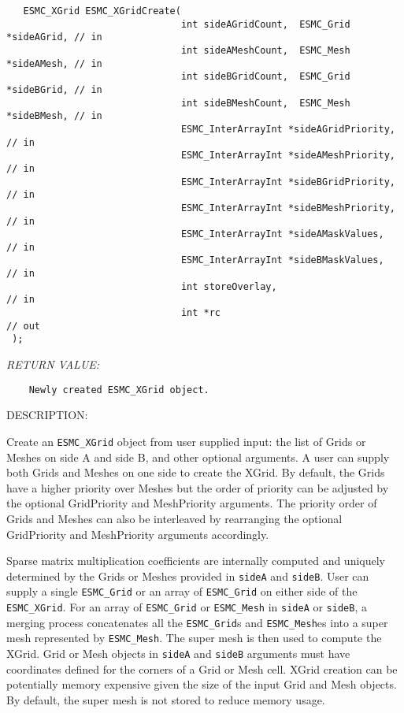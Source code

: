  
\begin{verbatim}   ESMC_XGrid ESMC_XGridCreate(
                               int sideAGridCount,  ESMC_Grid *sideAGrid, // in
                               int sideAMeshCount,  ESMC_Mesh *sideAMesh, // in
                               int sideBGridCount,  ESMC_Grid *sideBGrid, // in
                               int sideBMeshCount,  ESMC_Mesh *sideBMesh, // in
                               ESMC_InterArrayInt *sideAGridPriority,     // in
                               ESMC_InterArrayInt *sideAMeshPriority,     // in
                               ESMC_InterArrayInt *sideBGridPriority,     // in
                               ESMC_InterArrayInt *sideBMeshPriority,     // in
                               ESMC_InterArrayInt *sideAMaskValues,       // in
                               ESMC_InterArrayInt *sideBMaskValues,       // in
                               int storeOverlay,                          // in
                               int *rc                                    // out
 );
 \end{verbatim}{\em RETURN VALUE:}
\begin{verbatim}    Newly created ESMC_XGrid object.\end{verbatim}
{\sf DESCRIPTION:\\ }


  
        Create an {\tt ESMC\_XGrid} object from user supplied input: the list of Grids or Meshes on side A and side B, 
    and other optional arguments. A user can supply both Grids and Meshes on one side to create
    the XGrid. By default, the Grids have a higher priority over Meshes but the order of priority 
    can be adjusted by the optional GridPriority and MeshPriority arguments. The priority order
    of Grids and Meshes can also be interleaved by rearranging the optional 
    GridPriority and MeshPriority arguments accordingly.
    
    Sparse matrix multiplication coefficients are internally computed and
    uniquely determined by the Grids or Meshes provided in {\tt sideA} and {\tt sideB}. User can supply
    a single {\tt ESMC\_Grid} or an array of {\tt ESMC\_Grid} on either side of the 
    {\tt ESMC\_XGrid}. For an array of {\tt ESMC\_Grid} or {\tt ESMC\_Mesh} in {\tt sideA} or {\tt sideB},
    a merging process concatenates all the {\tt ESMC\_Grid}s and {\tt ESMC\_Mesh}es 
    into a super mesh represented
    by {\tt ESMC\_Mesh}. The super mesh is then used to compute the XGrid. 
    Grid or Mesh objects in {\tt sideA} and {\tt sideB} arguments must have coordinates defined for
    the corners of a Grid or Mesh cell. XGrid creation can be potentially memory expensive given the
    size of the input Grid and Mesh objects. By default, the super mesh is not stored
    to reduce memory usage. 
   
